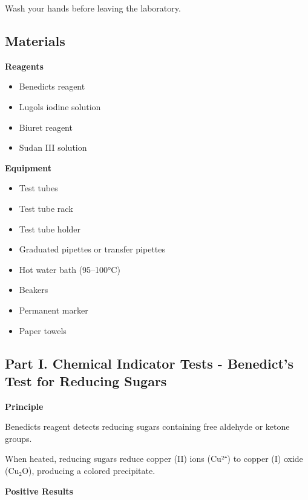 \documentclass[
  letterpaper,
  DIV=11,
  numbers=noendperiod]{scrreprt}
\begin{document}
Wash your hands before leaving the laboratory.

\subsection{\texorpdfstring{\textbf{Materials}}{Materials}}\label{materials}

\textbf{Reagents}

\begin{itemize}
\item
  Benedict\textquotesingle s reagent
\item
  Lugol\textquotesingle s iodine solution
\item
  Biuret reagent
\item
  Sudan III solution
\end{itemize}

\textbf{Equipment}

\begin{itemize}
\item
  Test tubes
\item
  Test tube rack
\item
  Test tube holder
\item
  Graduated pipettes or transfer pipettes
\item
  Hot water bath (95--100°C)
\item
  Beakers
\item
  Permanent marker
\item
  Paper towels
\end{itemize}

\subsection{\texorpdfstring{\textbf{Part I. Chemical Indicator Tests -
Benedict's Test for Reducing
Sugars}}{Part I. Chemical Indicator Tests - Benedict's Test for Reducing Sugars}}\label{part-i.-chemical-indicator-tests---benedicts-test-for-reducing-sugars}

\textbf{Principle}

Benedict\textquotesingle s reagent detects reducing sugars containing
free aldehyde or ketone groups.

When heated, reducing sugars reduce copper (II) ions (Cu²⁺) to copper
(I) oxide (Cu₂O), producing a colored precipitate.

\textbf{Positive Results}
\end{document}
